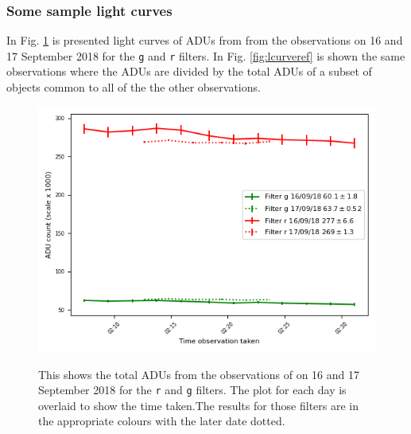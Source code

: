 \subsubsection{Some sample light curves}
\protect\label{section:samplelightcurves}

In Fig. \ref{fig:lcurvesing} is presented light curves of ADUs from {\prox}
from the observations on 16 and 17 September 2018 for the \texttt{g} and
\texttt{r} filters. In Fig. \ref{fig:lcurveref} is shown the same observations
where the ADUs are divided by the total ADUs of a subset of objects common to
all of the the other observations.

\begin{figure}[!htbp]
\begin{center}
\includegraphics[scale=1]{images/demo_lcurve.png}
\end{center}   
\caption{This shows the total ADUs from the observations of {\prox} on 16 and
17 September 2018 for the \texttt{r} and \texttt{g} filters. The plot for each
day is overlaid to show the time taken.The results for those filters are in the appropriate colours
with the later date dotted.}
\protect\label{fig:lcurvesing}
\end{figure}

